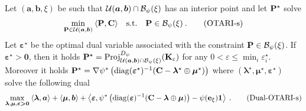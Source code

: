 \begin{proposition}
    Let $(\bm{a}, \bm{b}, \xi)$ be such that ${\mathcal{U}}(\bm{a}, \bm{b}) \cap \mathcal{B}_\psi(\xi)$ has an interior point and let ${\mathbf{P}}^\star$ solve
    \begin{align}
      \min_{{\mathbf{P}} \in {\mathcal{U}}(\bm{a}, \bm{b})} \: \langle {\mathbf{P}}, {\mathbf{C}} \rangle \quad \text{s.t.} \quad  {\mathbf{P}} \in \mathcal{B}_\psi(\xi) \:.
      \tag{OTARI-s}
  \end{align}
  Let $\bm{\varepsilon}^\star$ be the optimal dual variable associated with the constraint ${\mathbf{P}} \in \mathcal{B}_\psi(\xi)$.
  If $\bm{\varepsilon}^\star \bm{>} \bm{0}$, then it holds ${\mathbf{P}}^\star = \operatorname{Proj}^{D_\psi}_{{\mathcal{U}}(\bm{a}, \bm{b}) \cap \mathcal{B}_\psi(\xi)}({\mathbf{K}}_\varepsilon)$ for any $0 < \varepsilon \leq \min_i{\varepsilon_i^\star}$. Moreover it holds ${\mathbf{P}}^\star = \nabla \psi^* \left(\operatorname{diag}(\bm{\varepsilon}^\star)^{-1} ({\mathbf{C}} - \bm{\lambda}^\star \oplus \bm{\mu}^\star) \right)$ where $(\bm{\lambda}^\star, \bm{\mu}^\star, \bm{\varepsilon}^\star)$ solve the following dual
  \begin{align}
    \max_{\bm{\lambda}, \bm{\mu}, \bm{\varepsilon} \bm{>} \bm{0}} \: \langle \bm{\lambda}, \bm{a} \rangle + \langle \bm{\mu}, \bm{b} \rangle + \left\langle \bm{\varepsilon}, \psi^*\left(\operatorname{diag}(\bm{\varepsilon})^{-1} ({\mathbf{C}} - \bm{\lambda} \oplus \bm{\mu}) \right) - \psi(\mathbf{e}_\xi) \bm{1}  \right\rangle \:.
    \tag{Dual-OTARI-s}
  \end{align}
\end{proposition}

